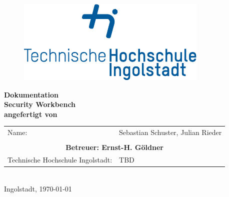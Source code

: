 
\begin{titlepage}

\phantom{tmpText}

\vspace{1cm}

\begin{figure}[h!]
\centering
\includegraphics[width=\textwidth]{bilder/thi_logo_cropped.pdf}
\end{figure}

  \begin{center}

    
    
    \textbf{{\large Dokumentation} \\[3ex]
    {\LARGE Security Workbench} \\[1ex]
    \vfill
    angefertigt von} \\
    \begin{tabular}{ll}
    	 \\
    	Name: & Sebastian Schuster, Julian Rieder\\
    	 \\
    	\multicolumn{2}{c}{\textbf{Betreuer: Ernst-H. Göldner}}\\
    	Technische Hochschule Ingolstadt: & TBD
    \end{tabular}\\[2ex] %
    \vfill
    Ingolstadt, \today
  \end{center}
\end{titlepage}
